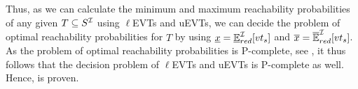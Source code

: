 Thus, as we can calculate the minimum and maximum reachability probabilities of any given $T\subseteq S^{\mathcal{I}}$ using $\ell$EVTs and uEVTs, we can decide the problem of optimal reachability probabilities for $T$ by using $\underline{x} = \mathbb{\underline{E}}^{\mathcal{I}}_{red}[vt_s]$ and $\overline{x} = \mathbb{\overline{E}}^{\mathcal{I}}_{red}[vt_s]$. As the problem of optimal reachability probabilities is P-complete, see \cite{complexity_model_checking_interval-valued_DTMCs}, it thus follows that the decision problem of $\ell$EVTs and uEVTs is P-complete as well. Hence,  is proven.